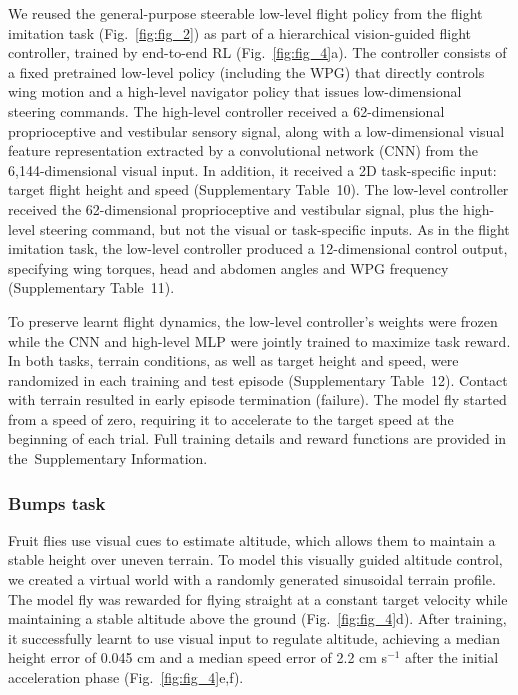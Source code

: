 \documentclass[sn-mathphys-num]{sn-jnl}%
\theoremstyle{thmstyleone}	%
\theoremstyle{thmstyletwo}	%
\theoremstyle{thmstylethree}	%
\begin{document}
We reused the general-purpose steerable low-level flight policy from the flight imitation task (Fig.~\ref{fig:fig_2}) as part of a hierarchical vision-guided flight controller, trained by end-to-end RL (Fig.~\ref{fig:fig_4}a). 
The controller consists of a fixed pretrained low-level policy (including the WPG) that directly controls wing motion and a high-level navigator policy that issues low-dimensional steering commands. 
The high-level controller received a 62-dimensional proprioceptive and vestibular sensory signal, along with a low-dimensional visual feature representation extracted by a convolutional network (CNN) from the 6,144-dimensional visual input. 
In addition, it received a 2D task-specific input: target flight height and speed (Supplementary Table 10). 
The low-level controller received the 62-dimensional proprioceptive and vestibular signal, plus the high-level steering command, but not the visual or task-specific inputs. 
As in the flight imitation task, the low-level controller produced a 12-dimensional control output, specifying wing torques, head and abdomen angles and WPG frequency (Supplementary Table 11).



To preserve learnt flight dynamics, the low-level controller's weights were frozen while the CNN and high-level MLP were jointly trained to maximize task reward. 
In both tasks, terrain conditions, as well as target height and speed, were randomized in each training and test episode (Supplementary Table 12). 
Contact with terrain resulted in early episode termination (failure). 
The model fly started from a speed of zero, requiring it to accelerate to the target speed at the beginning of each trial. 
Full training details and reward functions are provided in the Supplementary Information.


\subsubsection{Bumps task}

Fruit flies use visual cues to estimate altitude, which allows them to maintain a stable height over uneven terrain\cite{straw2010visual}. 
To model this visually guided altitude control, we created a virtual world with a randomly generated sinusoidal terrain profile. 
The model fly was rewarded for flying straight at a constant target velocity while maintaining a stable altitude above the ground (Fig.~\ref{fig:fig_4}d). 
After training, it successfully learnt to use visual input to regulate altitude, achieving a median height error of 0.045 cm and a median speed error of 2.2 cm s$ ^{-1} $ after the initial acceleration phase (Fig.~\ref{fig:fig_4}e,f).
\end{document}
